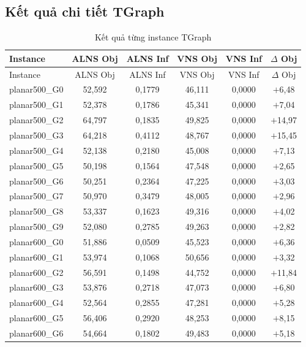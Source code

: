 \documentclass[12pt, a4paper]{article}
\begin{document}
\subsection{Kết quả chi tiết TGraph}
\label{app:tgraph}

\begin{longtable}{lccccc}
  \caption{Kết quả từng instance TGraph} \\
  \toprule
  Instance & ALNS Obj & ALNS Inf & VNS Obj & VNS Inf & $\Delta$ Obj \\
  \midrule
  \endfirsthead
  \toprule
  Instance & ALNS Obj & ALNS Inf & VNS Obj & VNS Inf & $\Delta$ Obj \\
  \midrule
  \endhead
  \bottomrule
  \endfoot
  planar500\_G0 & 52{,}592 & 0{,}1779 & 46{,}111 & 0{,}0000 & $+$6{,}48 \\
  planar500\_G1 & 52{,}378 & 0{,}1786 & 45{,}341 & 0{,}0000 & $+$7{,}04 \\
  planar500\_G2 & 64{,}797 & 0{,}1835 & 49{,}825 & 0{,}0000 & $+$14{,}97 \\
  planar500\_G3 & 64{,}218 & 0{,}4112 & 48{,}767 & 0{,}0000 & $+$15{,}45 \\
  planar500\_G4 & 52{,}138 & 0{,}2180 & 45{,}008 & 0{,}0000 & $+$7{,}13 \\
  planar500\_G5 & 50{,}198 & 0{,}1564 & 47{,}548 & 0{,}0000 & $+$2{,}65 \\
  planar500\_G6 & 50{,}251 & 0{,}2364 & 47{,}225 & 0{,}0000 & $+$3{,}03 \\
  planar500\_G7 & 50{,}970 & 0{,}3479 & 48{,}005 & 0{,}0000 & $+$2{,}96 \\
  planar500\_G8 & 53{,}337 & 0{,}1623 & 49{,}316 & 0{,}0000 & $+$4{,}02 \\
  planar500\_G9 & 52{,}080 & 0{,}2785 & 49{,}263 & 0{,}0000 & $+$2{,}82 \\
  \midrule
  planar600\_G0 & 51{,}886 & 0{,}0509 & 45{,}523 & 0{,}0000 & $+$6{,}36 \\
  planar600\_G1 & 53{,}974 & 0{,}1068 & 50{,}656 & 0{,}0000 & $+$3{,}32 \\
  planar600\_G2 & 56{,}591 & 0{,}1498 & 44{,}752 & 0{,}0000 & $+$11{,}84 \\
  planar600\_G3 & 53{,}876 & 0{,}2718 & 47{,}073 & 0{,}0000 & $+$6{,}80 \\
  planar600\_G4 & 52{,}564 & 0{,}2855 & 47{,}281 & 0{,}0000 & $+$5{,}28 \\
  planar600\_G5 & 56{,}406 & 0{,}2920 & 48{,}253 & 0{,}0000 & $+$8{,}15 \\
  planar600\_G6 & 54{,}664 & 0{,}1802 & 49{,}483 & 0{,}0000 & $+$5{,}18 \\

\end{longtable}
\end{document}
